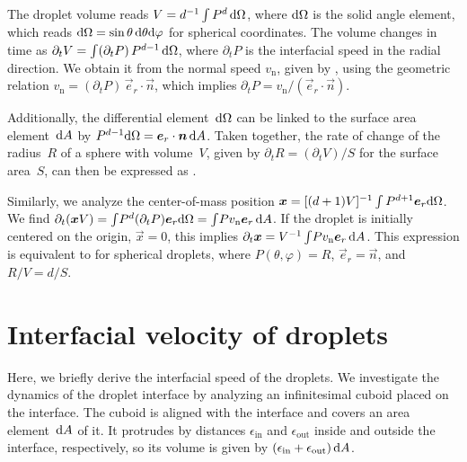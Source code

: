 \begin{appendices}
The droplet volume reads $V = d^{-1} \int P^d \, \mathrm{d}\Omega$, where $\mathrm{d}\Omega$ is the solid angle element, which reads $\mathrm{d}\Omega = \sin\theta \, \mathrm{d}\theta\mathrm{d}\varphi$ for spherical coordinates.
The volume changes in time as $\partial_t V = \int (\partial_t P) \, P^{d-1} \, \mathrm{d}\Omega$, where $\partial_t P$ is the interfacial speed in the radial direction.
We obtain it from the normal speed $v_\mathrm{n}$, given by , using the geometric relation $v_\mathrm{n} = (\partial_t P) \, \vec{e}_r \cdot \vec{n}$, which implies $\partial_t P = v_\mathrm{n} / (\vec{e}_r \cdot \vec{n})$.

Additionally, the differential element~$\mathrm{d}\Omega$ can be linked to the surface area element~$\mathrm{d} A$ by $P^{d-1}\mathrm{d}\Omega = \boldsymbol{e}_r \cdot \boldsymbol{n} \, \mathrm{d} A$.
Taken together, the rate of change of the radius~$R$ of a sphere with volume~$V$, given by $\partial_t R = (\partial_t V)/S$ for the surface area~$S$, can then be expressed as  .

Similarly, we analyze the center-of-mass position $\boldsymbol x = [(d+1)V]^{-1} \int P^{d+1} \boldsymbol{e}_r \mathrm{d}\Omega$.
We find $\partial_t(\boldsymbol x V) = \int \! P^d (\partial_t P) \boldsymbol{e}_r \mathrm{d}\Omega = \int \! P v_\mathrm{n} \boldsymbol{e}_r \, \mathrm{d} A$.
If the droplet is initially centered on the origin, $\vec x =0$, this implies  $\partial_t \boldsymbol x = V^{-1}\int \! P v_\mathrm{n} \boldsymbol{e}_r\, \mathrm{d} A$.
This expression is equivalent to  for spherical droplets, where $P(\theta, \varphi)=R$, $\vec{e}_r=\vec{n}$, and $R/V = d/S$.

\chapter{Interfacial velocity of droplets}

\label{sec:interfacial_speed_derivation}

Here, we briefly derive the interfacial speed of the droplets.  
We investigate the dynamics of the droplet interface by analyzing an infinitesimal cuboid placed on the interface.
The cuboid is aligned with the interface and covers an area element~$\mathrm{d} A$ of it.
It protrudes by distances $\epsilon_\mathrm{in}$ and $\epsilon_\mathrm{out}$ inside and outside the interface, respectively, so its volume is given by $(\epsilon_\mathrm{in} + \epsilon_\mathrm{out}) \, \mathrm{d} A$.


\end{appendices}
